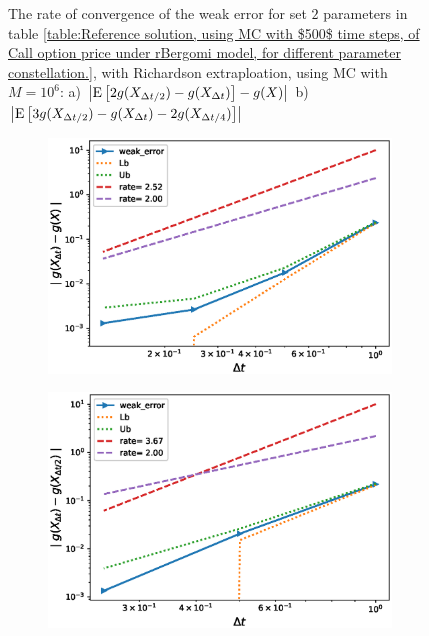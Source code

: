 \documentclass[11pt]{article}
\newcommand{\expt}[1]{\mathrm{E}\left[#1\right]}
\begin{document}
\begin{figure}[h!]
	\caption{The rate of convergence of the weak error for set $2$ parameters in table \ref{table:Reference solution, using MC with $500$ time steps, of Call option price under rBergomi model, for different parameter constellation.}, with Richardson extraploation, using MC with $M=10^6$: a) $\abs{\expt{2 g(X_{\Delta t/2}) -g(X_{\Delta t})}-g(X)}$  b) $\abs{\expt{3 g(X_{\Delta t/2})-g(X_{\Delta t})-2 g(X_{\Delta t/4})}}$ }
	\label{fig:Weak_rate_H_007_with_rich}
\end{figure}

\begin{figure}[!htbp]
	\centering
	\begin{subfigure}{.4\textwidth}
		\centering
		\includegraphics[width=1\linewidth]{./figures/rBergomi_weak_error_rates/with_richardson/H_007/weak_convergence_order_Bergomi_H_007_K_08_M_10_6_richardson_relative}
		\caption{}
		\label{fig:sub3}
	\end{subfigure}%
	\begin{subfigure}{.4\textwidth}
		\centering
		\includegraphics[width=1\linewidth]{./figures/rBergomi_weak_error_rates/with_richardson/H_007/weak_convergence_order_differences_Bergomi_H_007_K_08_M_10_6_richardson_relative}
		\caption{}
		\label{fig:sub4}
	\end{subfigure}
	


\end{figure}
\end{document}
